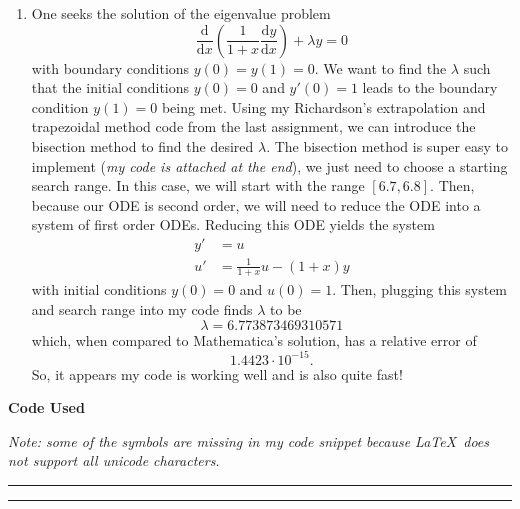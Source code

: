\documentclass[a4paper,12pt]{article}
\newcommand{\dd}{\mathrm{d}}
\begin{document}
\begin{enumerate}[label = (\arabic*)]
	\newpage
	\item One seeks the solution of the eigenvalue problem
	\[
		\frac{\dd}{\dd x} \left(\frac{1}{1 + x} \frac{\dd y}{\dd x}\right) + \lambda y = 0
	\]
	with boundary conditions $ y(0) = y(1) = 0 $. We want to find the $ \lambda $ such that the initial conditions $ y(0) = 0 $ and $ y'(0) = 1 $ leads to the boundary condition $ y(1) = 0 $ being met. Using my Richardson's extrapolation and trapezoidal method code from the last assignment, we can introduce the bisection method to find the desired $ \lambda $. The bisection method is super easy to implement (\emph{my code is attached at the end}), we just need to choose a starting search range. In this case, we will start with the range $ [6.7, 6.8] $. Then, because our ODE is second order, we will need to reduce the ODE into a system of first order ODEs. Reducing this ODE yields the system
	\begin{align*}
		y' &= u \\
		u' &= \frac{1}{1 + x} u - (1 + x) y
	\end{align*}
	with initial conditions $ y(0) = 0 $ and $ u(0) = 1 $. Then, plugging this system and search range into my code finds $ \lambda $ to be
	\[
		\lambda = 6.773873469310571
	\]
	which, when compared to Mathematica's solution, has a relative error of
	\[
		 1.4423 \cdot 10^{-15}.
	\]
	So, it appears my code is working well and is also quite fast!
\end{enumerate}

\textbf{Code Used}

\emph{Note: some of the symbols are missing in my code snippet because \LaTeX\ does not support all unicode characters.}

\vspace{-0.5cm}
\rule{\textwidth}{.4pt}

\rule{\textwidth}{.4pt}
\end{document}
